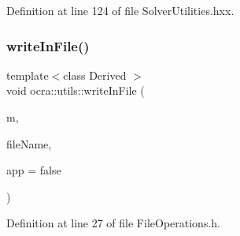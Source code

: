 Definition at line 124 of file Solver\+Utilities.\+hxx.

\hypertarget{namespaceocra_1_1utils_a3f12986cd4d4a40293f6003d9a86a45c}{}\label{namespaceocra_1_1utils_a3f12986cd4d4a40293f6003d9a86a45c} 
\subsubsection{\texorpdfstring{write\+In\+File()}{writeInFile()}\hspace{0.1cm}{\footnotesize\ttfamily [1/3]}}
{\footnotesize\ttfamily template$<$class Derived $>$ \\
void ocra\+::utils\+::write\+In\+File (\begin{DoxyParamCaption}\item[{const Matrix\+Base$<$ Derived $>$ \&}]{m,  }\item[{const std\+::string \&}]{file\+Name,  }\item[{bool}]{app = {\ttfamily false} }\end{DoxyParamCaption})\hspace{0.3cm}{\ttfamily [inline]}}



Definition at line 27 of file File\+Operations.\+h.

\hypertarget{namespaceocra_1_1utils_ac3e209e5a700c28cc6e38d79113017f2}{}\label{namespaceocra_1_1utils_ac3e209e5a700c28cc6e38d79113017f2} 
